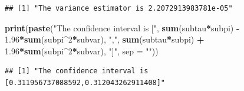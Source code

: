 \documentclass[]{article}
\newenvironment{Shaded}{\begin{snugshade}}{\end{snugshade}}
\newcommand{\KeywordTok}[1]{\textcolor[rgb]{0.13,0.29,0.53}{\textbf{#1}}}
\newcommand{\DataTypeTok}[1]{\textcolor[rgb]{0.13,0.29,0.53}{#1}}
\newcommand{\DecValTok}[1]{\textcolor[rgb]{0.00,0.00,0.81}{#1}}
\newcommand{\FloatTok}[1]{\textcolor[rgb]{0.00,0.00,0.81}{#1}}
\newcommand{\StringTok}[1]{\textcolor[rgb]{0.31,0.60,0.02}{#1}}
\newcommand{\OperatorTok}[1]{\textcolor[rgb]{0.81,0.36,0.00}{\textbf{#1}}}
\newcommand{\NormalTok}[1]{#1}
\begin{document}
\begin{verbatim}
## [1] "The variance estimator is 2.2072913983781e-05"
\end{verbatim}

\begin{Shaded}
\begin{Highlighting}[]
\KeywordTok{print}\NormalTok{(}\KeywordTok{paste}\NormalTok{(}\StringTok{"The confidence interval is ["}\NormalTok{, }\KeywordTok{sum}\NormalTok{(subtau}\OperatorTok{*}\NormalTok{subpi) }\OperatorTok{-}\StringTok{ }\FloatTok{1.96}\OperatorTok{*}\KeywordTok{sum}\NormalTok{(subpi}\OperatorTok{^}\DecValTok{2}\OperatorTok{*}\NormalTok{subvar), }\StringTok{","}\NormalTok{, }\KeywordTok{sum}\NormalTok{(subtau}\OperatorTok{*}\NormalTok{subpi) }\OperatorTok{+}\StringTok{ }\FloatTok{1.96}\OperatorTok{*}\KeywordTok{sum}\NormalTok{(subpi}\OperatorTok{^}\DecValTok{2}\OperatorTok{*}\NormalTok{subvar), }\StringTok{"]"}\NormalTok{, }\DataTypeTok{sep =} \StringTok{""}\NormalTok{))}
\end{Highlighting}
\end{Shaded}

\begin{verbatim}
## [1] "The confidence interval is [0.311956737088592,0.312043262911408]"
\end{verbatim}
\end{document}
